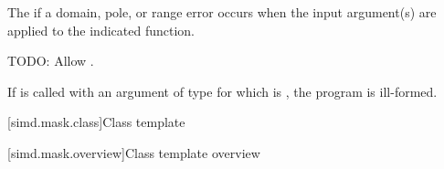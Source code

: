\pnum
The  if a domain, pole, or range error occurs when the input argument(s) are applied to the indicated  function.

\begin{wgBAdd}
  \pnum
  TODO: Allow .
\end{wgBAdd}

\pnum
If  is called with an argument of type  for which  is , the program is ill-formed.

[simd.mask.class]{Class template }

[simd.mask.overview]{Class template  overview}


